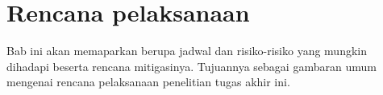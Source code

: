 \chapter{Rencana pelaksanaan}
\label{chapter:rencana-pelaksanaan}
Bab ini akan memaparkan berupa jadwal dan risiko-risiko yang mungkin dihadapi beserta rencana mitigasinya. Tujuannya sebagai gambaran umum mengenai rencana pelaksanaan penelitian tugas akhir ini.





